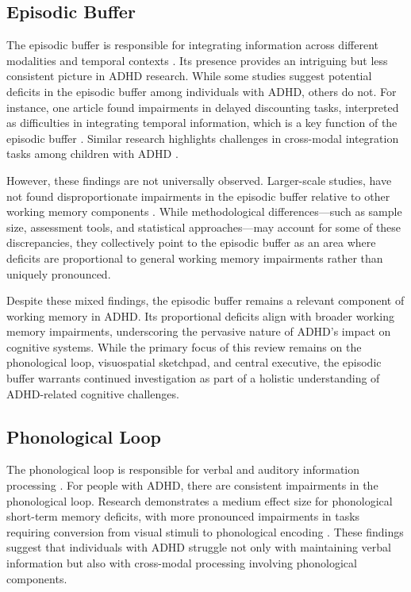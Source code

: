 \documentclass[stu]{apa7}
\begin{document}
\subsection{Episodic Buffer}

The episodic buffer is responsible for integrating information across different modalities and temporal contexts \parencite{baddeley_developments_1994}. Its presence provides an intriguing but less consistent picture in ADHD research. While some studies  suggest potential deficits in the episodic buffer among individuals with ADHD, others do not. For instance, one article found impairments in delayed discounting tasks, interpreted as difficulties in integrating temporal information, which is a key function of the episodic buffer \parencite{fabio_working_2020}. Similar research highlights challenges in cross-modal integration tasks among children with ADHD \parencite{nyhout_episodic_2023}.

However, these findings are not universally observed. Larger-scale studies, have not found disproportionate impairments in the episodic buffer relative to other working memory components \parencite{kofler_are_2018}. While methodological differences—such as sample size, assessment tools, and statistical approaches—may account for some of these discrepancies, they collectively point to the episodic buffer as an area where deficits are proportional to general working memory impairments rather than uniquely pronounced.

Despite these mixed findings, the episodic buffer remains a relevant component of working memory in ADHD. Its proportional deficits align with broader working memory impairments, underscoring the pervasive nature of ADHD's impact on cognitive systems. While the primary focus of this review remains on the phonological loop, visuospatial sketchpad, and central executive, the episodic buffer warrants continued investigation as part of a holistic understanding of ADHD-related cognitive challenges.

\subsection{Phonological Loop}

The phonological loop is responsible for verbal and auditory information processing \parencite{baddeley_developments_1994}. For people with ADHD, there are consistent impairments in the phonological loop. Research demonstrates a medium effect size for phonological short-term memory deficits, with more pronounced impairments in tasks requiring conversion from visual stimuli to phonological encoding \parencite{friedman_reading_2017}. These findings suggest that individuals with ADHD struggle not only with maintaining verbal information but also with cross-modal processing involving phonological components.
\end{document}

